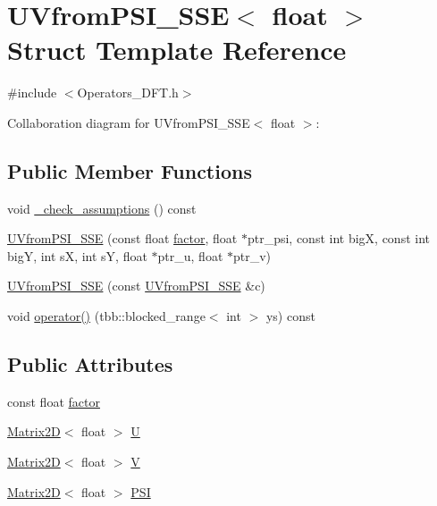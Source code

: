 \hypertarget{struct_u_vfrom_p_s_i___s_s_e_3_01float_01_4}{}\section{U\+Vfrom\+P\+S\+I\+\_\+\+S\+S\+E$<$ float $>$ Struct Template Reference}
\label{struct_u_vfrom_p_s_i___s_s_e_3_01float_01_4}


{\ttfamily \#include $<$Operators\+\_\+\+D\+F\+T.\+h$>$}



Collaboration diagram for U\+Vfrom\+P\+S\+I\+\_\+\+S\+S\+E$<$ float $>$\+:
\subsection*{Public Member Functions}
\begin{DoxyCompactItemize}
\item 
void \hyperlink{struct_u_vfrom_p_s_i___s_s_e_3_01float_01_4_a881d64138872b749a022d15096b16f35}{\+\_\+check\+\_\+assumptions} () const 
\item 
\hyperlink{struct_u_vfrom_p_s_i___s_s_e_3_01float_01_4_ae8cbc637b76f83a4e5ed40a20a9f7576}{U\+Vfrom\+P\+S\+I\+\_\+\+S\+S\+E} (const float \hyperlink{struct_u_vfrom_p_s_i___s_s_e_3_01float_01_4_a0cdc869087c869067277eae491256240}{factor}, float $\ast$ptr\+\_\+psi, const int big\+X, const int big\+Y, int s\+X, int s\+Y, float $\ast$ptr\+\_\+u, float $\ast$ptr\+\_\+v)
\item 
\hyperlink{struct_u_vfrom_p_s_i___s_s_e_3_01float_01_4_a627413c6971bd69a9a4174700071940a}{U\+Vfrom\+P\+S\+I\+\_\+\+S\+S\+E} (const \hyperlink{struct_u_vfrom_p_s_i___s_s_e}{U\+Vfrom\+P\+S\+I\+\_\+\+S\+S\+E} \&c)
\item 
void \hyperlink{struct_u_vfrom_p_s_i___s_s_e_3_01float_01_4_aff805046b744c5b622b8a241e1dac4a3}{operator()} (tbb\+::blocked\+\_\+range$<$ int $>$ ys) const 
\end{DoxyCompactItemize}
\subsection*{Public Attributes}
\begin{DoxyCompactItemize}
\item 
const float \hyperlink{struct_u_vfrom_p_s_i___s_s_e_3_01float_01_4_a0cdc869087c869067277eae491256240}{factor}
\item 
\hyperlink{class_matrix2_d}{Matrix2\+D}$<$ float $>$ \hyperlink{struct_u_vfrom_p_s_i___s_s_e_3_01float_01_4_aabb930a81564e88a23524891da5f45a9}{U}
\item 
\hyperlink{class_matrix2_d}{Matrix2\+D}$<$ float $>$ \hyperlink{struct_u_vfrom_p_s_i___s_s_e_3_01float_01_4_a377c8c663c9d5a4552f9fa943fbfd826}{V}
\item 
\hyperlink{class_matrix2_d}{Matrix2\+D}$<$ float $>$ \hyperlink{struct_u_vfrom_p_s_i___s_s_e_3_01float_01_4_abc94af3bcf4d3d119bcc0290484ead90}{P\+S\+I}
\end{DoxyCompactItemize}
